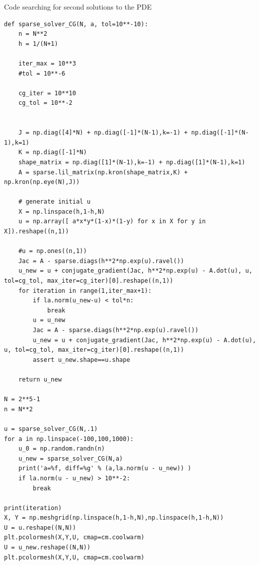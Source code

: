 \documentclass[12pt]{article}
\begin{document}
Code searching for second solutions to the PDE
\begin{lstlisting}
def sparse_solver_CG(N, a, tol=10**-10):
	n = N**2
	h = 1/(N+1)
	
	iter_max = 10**3
	#tol = 10**-6
	
	cg_iter = 10**10
	cg_tol = 10**-2
	
	
	J = np.diag([4]*N) + np.diag([-1]*(N-1),k=-1) + np.diag([-1]*(N-1),k=1)
	K = np.diag([-1]*N)
	shape_matrix = np.diag([1]*(N-1),k=-1) + np.diag([1]*(N-1),k=1)
	A = sparse.lil_matrix(np.kron(shape_matrix,K) + np.kron(np.eye(N),J))
	
	# generate initial u
	X = np.linspace(h,1-h,N)
	u = np.array([ a*x*y*(1-x)*(1-y) for x in X for y in X]).reshape((n,1))
	
	#u = np.ones((n,1))
	Jac = A - sparse.diags(h**2*np.exp(u).ravel())
	u_new = u + conjugate_gradient(Jac, h**2*np.exp(u) - A.dot(u), u, tol=cg_tol, max_iter=cg_iter)[0].reshape((n,1))
	for iteration in range(1,iter_max+1):
		if la.norm(u_new-u) < tol*n:
			break
		u = u_new
		Jac = A - sparse.diags(h**2*np.exp(u).ravel())
		u_new = u + conjugate_gradient(Jac, h**2*np.exp(u) - A.dot(u), u, tol=cg_tol, max_iter=cg_iter)[0].reshape((n,1))
		assert u_new.shape==u.shape
	
	return u_new

N = 2**5-1
n = N**2

u = sparse_solver_CG(N,.1)
for a in np.linspace(-100,100,1000):
	u_0 = np.random.randn(n)
	u_new = sparse_solver_CG(N,a)
	print('a=%f, diff=%g' % (a,la.norm(u - u_new)) )
	if la.norm(u - u_new) > 10**-2:
		break

print(iteration)
X, Y = np.meshgrid(np.linspace(h,1-h,N),np.linspace(h,1-h,N))
U = u.reshape((N,N))
plt.pcolormesh(X,Y,U, cmap=cm.coolwarm)
U = u_new.reshape((N,N))
plt.pcolormesh(X,Y,U, cmap=cm.coolwarm)
\end{lstlisting}
\end{document}
